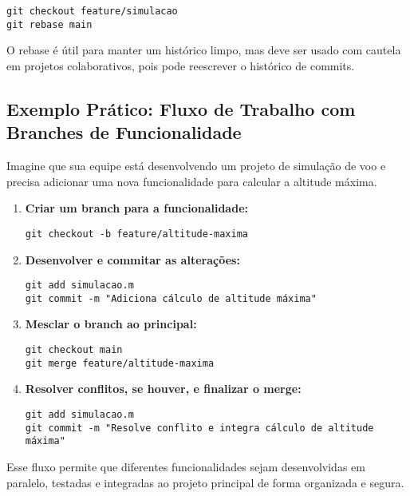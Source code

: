 \begin{lstlisting}[style=shellstyle]
git checkout feature/simulacao
git rebase main
\end{lstlisting}

O rebase é útil para manter um histórico limpo, mas deve ser usado com cautela em projetos colaborativos, pois pode reescrever o histórico de commits.

\subsection{Exemplo Prático: Fluxo de Trabalho com Branches de Funcionalidade}

Imagine que sua equipe está desenvolvendo um projeto de simulação de voo e precisa adicionar uma nova funcionalidade para calcular a altitude máxima.

\begin{enumerate}
    \item \textbf{Criar um branch para a funcionalidade:}
    \begin{lstlisting}[style=shellstyle]
git checkout -b feature/altitude-maxima
    \end{lstlisting}
    \item \textbf{Desenvolver e commitar as alterações:}
    \begin{lstlisting}[style=shellstyle]
git add simulacao.m
git commit -m "Adiciona cálculo de altitude máxima"
    \end{lstlisting}
    \item \textbf{Mesclar o branch ao principal:}
    \begin{lstlisting}[style=shellstyle]
git checkout main
git merge feature/altitude-maxima
    \end{lstlisting}
    \item \textbf{Resolver conflitos, se houver, e finalizar o merge:}
    \begin{lstlisting}[style=shellstyle]
git add simulacao.m
git commit -m "Resolve conflito e integra cálculo de altitude máxima"
    \end{lstlisting}
\end{enumerate}

Esse fluxo permite que diferentes funcionalidades sejam desenvolvidas em paralelo, testadas e integradas ao projeto principal de forma organizada e segura.


